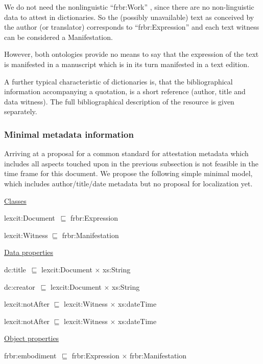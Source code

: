 \documentclass[10pt]{article}
\begin{document}
 We do not need the nonlinguistic ``frbr:Work'' , since there are no non-linguistic data to attest in dictionaries. So the (possibly unavailable) text as conceived by the author (or translator) corresponds to ``frbr:Expression'' and each text witness can be  considered a Manifestation.  
 
 However, both ontologies provide no means to say that the expression of the text is manifested in a manuscript which is in its turn manifested in a text edition.\par

 A further typical characteristic of dictionaries is, that the bibliographical information accompanying a quotation, is a short reference (author, title and data witness). The full bibliographical description of the resource is given separately.\par


\subsubsection*{Minimal metadata information}


Arriving at a proposal for a common standard for attestation metadata which includes all aspects touched upon in the previous subsection is not feasible in the time frame for this document. We propose the following simple minimal model, which includes author/title/date metadata but no proposal for localization yet.


\bigskip


{\fontsize{9pt}{10.8pt}\selectfont 
\uline{Classes}

lexcit:Document\  $\sqsubseteq$  frbr:Expression

lexcit:Witness $\sqsubseteq$  frbr:Manifestation




 \uline{Data properties}

dc:title\  $\sqsubseteq$  lexcit:Document $ \times $  xs:String

dc:creator\  $\sqsubseteq$  lexcit:Document $ \times $  xs:String

lexcit:notAfter $\sqsubseteq$  lexcit:Witness $ \times $  xs:dateTime

lexcit:notAfter $\sqsubseteq$  lexcit:Witness $ \times $  xs:dateTime





\uline{Object properties}

frbr:embodiment\   $\sqsubseteq$  frbr:Expression $ \times $  frbr:Manifestation
}
\end{document}
